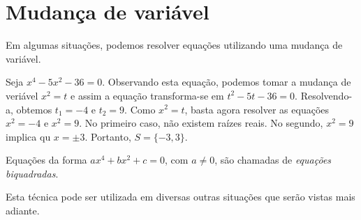 \section{Mudança de variável}

Em algumas situações, podemos resolver equações utilizando uma mudança de variável.

\begin{exem}
    Seja $x^4-5x^2-36=0$. Observando esta equação, podemos tomar a mudança de veriável $x^2=t$ e assim a equação transforma-se em $t^2-5t-36=0$. Resolvendo-a, obtemos $t_1=-4$ e $t_2=9$. Como $x^2=t$, basta agora resolver as equações $x^2=-4$ e $x^2=9$. No primeiro caso, não existem raízes reais. No segundo, $x^2=9$ implica qu $x=\pm 3$. Portanto, $S=\{-3,3\}$.
\end{exem}

\begin{obs}
Equações da forma $ax^4+bx^2+c=0$, com $a\neq 0$, são chamadas de \emph{equações biquadradas}.
\end{obs}

Esta técnica pode ser utilizada em diversas outras situações que serão vistas mais adiante.


